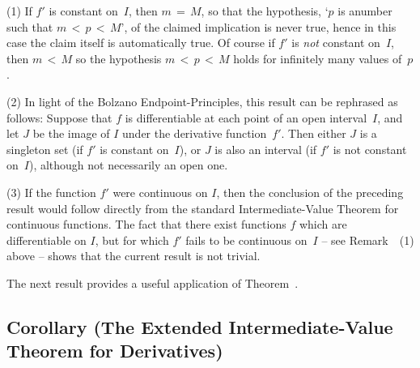 \V

\hspace*{\parindent} (1) If $f'$ is constant on~$I$, then $m \,=\, M$, so that the hypothesis, `$p$ is anumber such that $m\,<\,p\,<\,M$', of the claimed implication is never true,
    hence in this case the claim itself is automatically true.
    Of course if $f'$ is {\em not} constant on~$I$, then $m\,<\,M$ so the hypothesis $m\,<\,p\,<\,M$ holds for infinitely many values of~$p$.

\V

        (2) In light of the Bolzano Endpoint-Principles, this result can be rephrased as follows:
    Suppose that $f$ is differentiable at each point of an open interval~$I$, and let $J$ be the image of $I$ under the derivative function~$f'$.
    Then either $J$ is a singleton set (if $f'$ is constant on~$I$), or $J$ is also an interval (if $f'$ is not constant on~$I$), although not necessarily an open one.

\V

        (3) If the function $f'$ were continuous on $I$, then the conclusion of the preceding result
    would follow directly from the standard Intermediate-Value Theorem for continuous functions. The fact that there exist functions $f$ which are differentiable on $I$,
    but for which $f'$ fails to be continuous on~$I$ -- see Remark~~(1) above -- shows that the current result is not trivial.

\V


\VV

        The next result provides a useful application of Theorem~.

\V

            \subsection{\small{\bf Corollary} (The Extended Intermediate-Value Theorem for Derivatives)}
            \label{CorE40.35C}

